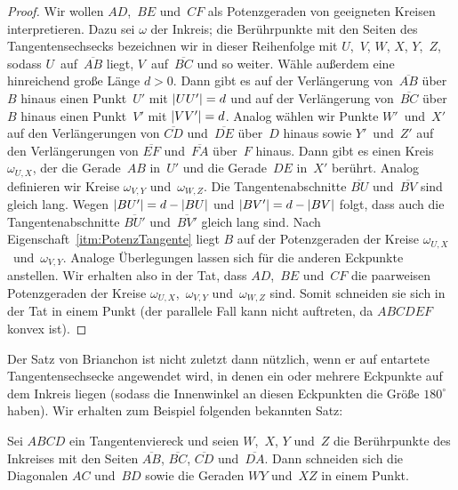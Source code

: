 \begin{proof}
	Wir wollen $AD$,~$BE$ und~$CF$ als Potenzgeraden von geeigneten Kreisen interpretieren. Dazu sei $\omega$ der Inkreis; die Berührpunkte mit den Seiten des Tangentensechsecks bezeichnen wir in dieser Reihenfolge mit $U$,~$V$, $W$, $X$, $Y$,~$Z$, sodass $U$~auf~$\overline{AB}$ liegt, $V$~auf~$\overline{BC}$ und so weiter. Wähle außerdem eine hinreichend große Länge $d>0$. Dann gibt es auf der Verlängerung von~$\overline{AB}$ über~$B$ hinaus einen Punkt~$U'$ mit $\lvert UU'\rvert=d$ und auf der Verlängerung von~$\overline{BC}$ über~$B$ hinaus einen Punkt~$V'$ mit $\lvert VV'\rvert=d$. Analog wählen wir Punkte $W'$~und~$X'$ auf den Verlängerungen von $\overline{CD}$ und~$\overline{DE}$ über~$D$ hinaus sowie $Y'$~und~$Z'$ auf den Verlängerungen von $\overline{EF}$ und~$\overline{FA}$ über~$F$ hinaus. Dann gibt es einen Kreis~$\omega_{U,X}$, der die Gerade~$AB$ in~$U'$ und die Gerade~$DE$ in~$X'$ berührt. Analog definieren wir Kreise $\omega_{V,Y}$ und~$\omega_{W,Z}$. Die Tangentenabschnitte $\overline{BU}$ und~$\overline{BV}$ sind gleich lang. Wegen $\lvert BU'\rvert=d-\lvert BU\rvert$ und $\lvert BV'\rvert=d-\lvert BV\rvert$ folgt, dass auch die Tangentenabschnitte $\overline{BU'}$ und~$\overline{BV'}$ gleich lang sind. Nach Eigenschaft~\ref{itm:PotenzTangente} liegt $B$ auf der Potenzgeraden der Kreise $\omega_{U,X}$~und~$\omega_{V,Y}$.
	Analoge Überlegungen lassen sich für die anderen Eckpunkte anstellen. Wir erhalten also in der Tat, dass $AD$,~$BE$ und~$CF$ die paarweisen Potenzgeraden der Kreise $\omega_{U,X}$,~$\omega_{V,Y}$ und~$\omega_{W,Z}$ sind. Somit schneiden sie sich in der Tat in einem Punkt (der parallele Fall kann nicht auftreten, da $ABCDEF$ konvex ist).
\end{proof}

Der Satz von Brianchon ist nicht zuletzt dann nützlich, wenn er auf entartete Tangentensechsecke angewendet wird, in denen ein oder mehrere Eckpunkte auf dem Inkreis liegen (sodass die Innenwinkel an diesen Eckpunkten die Größe $180^\circ$ haben). Wir erhalten zum Beispiel folgenden bekannten Satz:

\begin{satzmitnamen}[Satz]
	Sei $ABCD$ ein Tangentenviereck und seien $W$,~$X$, $Y$ und~$Z$ die Berührpunkte des Inkreises mit den Seiten $\overline{AB}$, $\overline{BC}$, $\overline{CD}$ und~$\overline{DA}$. Dann schneiden sich die Diagonalen $AC$ und~$BD$ sowie die Geraden $WY$ und~$XZ$ in einem Punkt.
\end{satzmitnamen}

